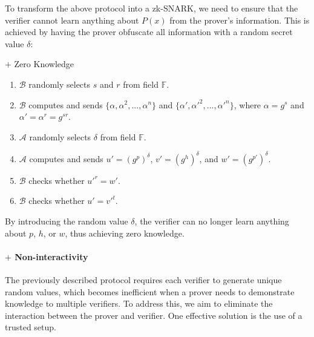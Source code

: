\documentclass{article}
\begin{document}
To transform the above protocol into a zk-SNARK, we need to ensure that the verifier cannot learn anything about $P(x)$ from the prover's information. This is achieved by having the prover obfuscate all information with a random secret value $\delta$:

\begin{protocol}{$+$ Zero Knowledge}{}
\begin{enumerate}
    \item $\mathcal{B}$ randomly selects $s$ and $r$ from field $\mathbb{F}$.
    \item $\mathcal{B}$ computes and sends $\{\alpha, \alpha^2, ..., \alpha^{n}\}$ and $\{\alpha', \alpha'^2, ..., \alpha'^{n}\}$, where $\alpha = g^{s}$ and $\alpha' = \alpha^{r} = g^{sr}$.
    \item $\mathcal{A}$ randomly selects $\delta$ from field $\mathbb{F}$.
    \item $\mathcal{A}$ computes and sends $u' = (g^{p})^{\delta}$, $v' = (g^{h})^{\delta}$, and $w' = (g^{p'})^{\delta}$.
    \item $\mathcal{B}$ checks whether $u'^{r} = w'$.
    \item $\mathcal{B}$ checks whether $u' = v'^{t}$.
\end{enumerate}
\end{protocol}

By introducing the random value $\delta$, the verifier can no longer learn anything about $p$, $h$, or $w$, thus achieving zero knowledge.

\paragraph{$+$ Non-interactivity}

The previously described protocol requires each verifier to generate unique random values, which becomes inefficient when a prover needs to demonstrate knowledge to multiple verifiers. To address this, we aim to eliminate the interaction between the prover and verifier. One effective solution is the use of a trusted setup.
\end{document}
